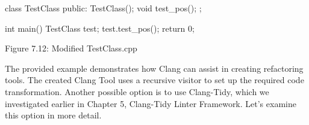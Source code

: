 \begin{cpp}
class TestClass {
public:
  TestClass(){};
  void test_pos(){};
};

int main() {
  TestClass test;
  test.test_pos();
  return 0;
}
\end{cpp}

\begin{center}
Figure 7.12: Modified TestClass.cpp
\end{center}

The provided example demonstrates how Clang can assist in creating refactoring tools. The created Clang Tool uses a recursive visitor to set up the required code transformation. Another possible option is to use Clang-Tidy, which we investigated earlier in Chapter 5, Clang-Tidy Linter Framework. Let's examine this option in more detail.





















































